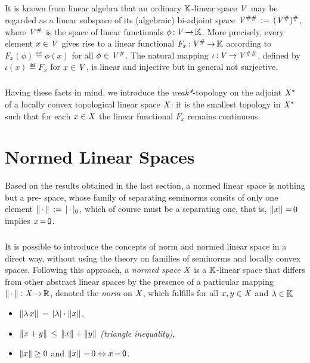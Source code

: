 \documentclass[11pt,twoside]{article}
\begin{document}
\subparagraph*{} %
It is known from linear algebra
that an ordinary ${\mathbb{K}}$-linear space $\mathit{V}$ may be regarded
as a linear subspace of its (algebraic) bi-adjoint space
$\mathit{V}^{\#\#} \,:=\, (\mathit{V}^{\#})^{\#}$,
where $\mathit{V}^{\#}$ is the space of linear functionals $\phi{\,:\,}\mathit{V} {\,\to\,} {\mathbb{K}}$.
More precisely,
every element $x \in \mathit{V}$ gives rise to a linear functional
$F_x{\,:\,}\mathit{V}^{\#} {\,\to\,} {\mathbb{K}}$ according to
$F_x(\phi) \eqdef \phi(x)$ for all $\phi \in \mathit{V}^{\#}$.
The natural mapping $\iota{\,:\,}\mathit{V} {\,\to\,} \mathit{V}^{\#\#}$,
defined by $\iota(x) \eqdef F_x$ for $x \in \mathit{V}$,
is linear and injective but in general not surjective.

\subparagraph*{} %
Having these facts in mind,
we introduce the \textit{weak*}-topology on the adjoint $\mathit{X}^*$
of a locally convex topological linear space $\mathit{X}$:
it is the smallest topology in $\mathit{X}^*$
such that
for each $x \in \mathit{X}$ the linear functional $F_x$ remains continuous.

\section{Normed Linear Spaces}                                                 %
Based on the results obtained in the last section,
a normed linear space is nothing but a pre-{\FRECHET} space,
whose family of separating seminorms consits of only one element
$\norm{\,\cdot\,} \eqdef \abs{\,\cdot\,} _0$,
which of course must be a separating one,
that is,
$\left\lVert x \right\rVert {\,=\,} 0$ implies $x {\,=\,} {\mathsf{0}}$.

\subparagraph*{}
It is possible to introduce the concepts of norm and normed linear space
in a direct way, 
{\ie} without using the theory on families of seminorms
and locally convex spaces.
Following this approach,
a \textit{normed space} $\mathit{X}$ is a ${\mathbb{K}}$-linear space
that differs from other abstract linear spaces
by the presence of a particular mapping $\left\lVert \,\cdot\, \right\rVert: \mathit{X} {\,\to\,} {\mathbb{R}}$,
denoted the \textit{norm} on $\mathit{X}$,
which fulfills for all $x,y \in \mathit{X}$ and $\lambda \in {\mathbb{K}}$

\begin{itemize}[leftmargin=55pt,itemsep=2pt]
\item[(N-1)] \quad
$\norm{\lambda \, x} \= \abs{\lambda} \cdot \norm{x}$,

\item[(N-2)] \quad
$\left\lVert x+y \right\rVert \, \leq \, \left\lVert x \right\rVert + \left\lVert y \right\rVert$
\; \textit{(triangle inequality)},

\item[(N-3)] \quad
$\left\lVert x \right\rVert \geq 0$ and $\left\lVert x \right\rVert {\,=\,} 0 \Leftrightarrow x {\,=\,} {\mathsf{0}}$.
\end{itemize}
\end{document}
